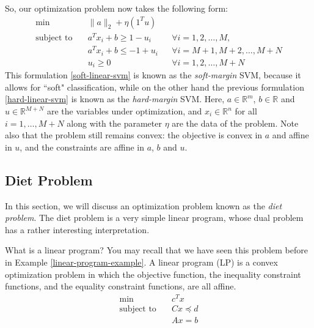 \documentclass[a4paper]{article}
\theoremstyle{definition}
\begin{document}
So, our optimization problem now takes the following form:
\begin{equation}
	\label{soft-linear-svm}
	\begin{aligned}
		\min \quad & \| a \|_2 + \eta (1^T u) && \\
		\text{subject to} \quad & a^T x_i + b \geq 1 - u_i && \forall i = 1, 2, \dots, M, \\
		& a^T x_i + b \leq -1 + u_i && \forall i = M{+}1, M{+}2, \dots, M{+}N \\
		& u_i \geq 0 && \forall i = 1, 2, \dots, M{+}N
	\end{aligned}
\end{equation}
This formulation \eqref{soft-linear-svm} is known as the \textit{soft-margin} SVM, because it allows for ``soft" classification, while on the other hand the previous formulation \eqref{hard-linear-svm} is known as the \textit{hard-margin} SVM.
Here, $a \in \mathbb{R}^m$, $b \in \mathbb{R}$ and $u \in \mathbb{R}^{M{+}N}$ are the variables under optimization, and $x_i \in \mathbb{R}^n$ for all $i = 1, \dots, M{+}N$ along with the parameter $\eta$ are the data of the problem.
Note also that the problem still remains convex: the objective is convex in $a$ and affine in $u$, and the constraints are affine in $a$, $b$ and $u$.

\subsection{Diet Problem}

In this section, we will discuss an optimization problem known as the \textit{diet problem}.
The diet problem is a very simple linear program, whose dual problem has a rather interesting interpretation.

What is a linear program?
You may recall that we have seen this problem before in Example \ref{linear-program-example}.
A linear program (LP) is a convex optimization problem in which the objective function, the inequality constraint functions, and the equality constraint functions, are all affine.
\begin{equation}
	\label{linear-program}
	\begin{aligned}
		\min \quad & c^T x \\
		\text{subject to} \quad & Cx \preceq d \\
		& Ax = b
	\end{aligned}
\end{equation}
\end{document}
